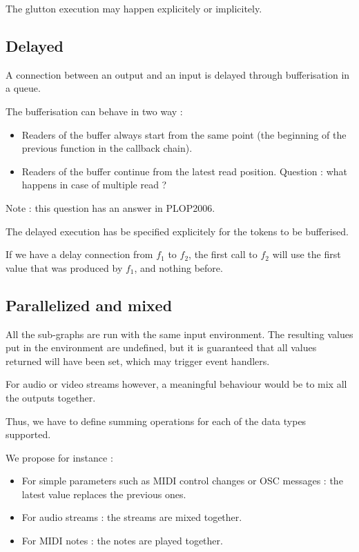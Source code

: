 \documentclass{article}
\begin{document}
    The glutton execution may happen explicitely or implicitely.
    
	\subsection{Delayed}
	A connection between an output and an input is delayed through bufferisation in a queue.
	
	The bufferisation can behave in two way :
	\begin{itemize}
		\item Readers of the buffer always start from the same point (the beginning of the previous function in the callback chain).
		\item Readers of the buffer continue from the latest read position.
		Question : what happens in case of multiple read ?
	\end{itemize}
	
    Note : this question has an answer in PLOP2006.
    
    The delayed execution has be specified explicitely for the tokens to be bufferised.
    
    If we have a delay connection from $f_1$ to $f_2$, the first call to $f_2$ will use the first value that was produced by $f_1$, and nothing before.
	
	\subsection{Parallelized and mixed}
	All the sub-graphs are run with the same input environment. 
	The resulting values put in the environment are undefined, but it is guaranteed that all values returned will have been set, which may trigger event handlers.
    
    For audio or video streams however, a meaningful behaviour would be to mix all the outputs together.
    
    Thus, we have to define summing operations for each of the data types supported.
    
    We propose for instance : 
    \begin{itemize}
        \item For simple parameters such as MIDI control changes or OSC messages : the latest value replaces the previous ones.
        \item For audio streams : the streams are mixed together.
        \item For MIDI notes : the notes are played together.
    \end{itemize}
\end{document}
